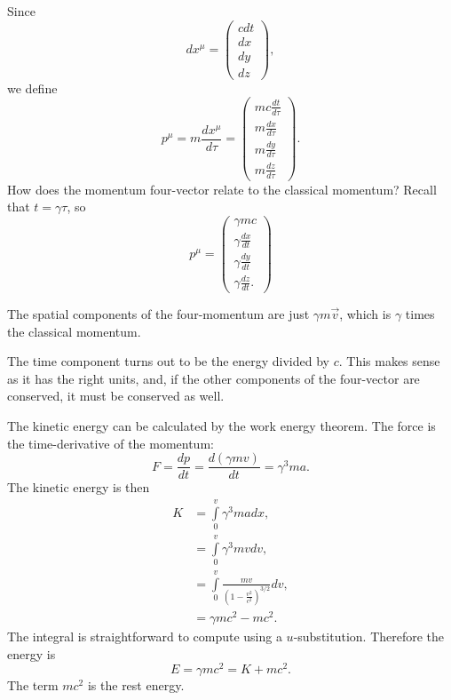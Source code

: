 Since 
\[dx^\mu = \begin{pmatrix}
    cdt \\ dx \\ dy \\ dz
\end{pmatrix}, \] we define 
\[ p^\mu = m \frac{dx^\mu}{d\tau} = \begin{pmatrix}
     mc \frac{dt}{d\tau} \\ m\frac{dx}{d\tau} \\
    m\frac{dy}{d\tau} 
    \\ 
    m\frac{dz}{d\tau}
\end{pmatrix} .\] 
How does the momentum four-vector relate to the classical momentum? Recall that $t = \gamma \tau$, so \[ p^\mu =  \begin{pmatrix}
    \gamma m c \\ \gamma \frac{dx}{dt} \\
    \gamma \frac{dy}{dt} 
    \\ 
    \gamma \frac{dz}{dt}.
\end{pmatrix} \] 

The spatial components of the four-momentum are just $\gamma m \vec{v}$, which is $\gamma$ times the classical momentum. 

The time component turns out to be the energy divided by $c$. This makes sense as it has the right units, and, if the other components of the four-vector are conserved, it must be conserved as well. 

The kinetic energy can be calculated by the work energy theorem. The force is the time-derivative of the momentum: \[F = \frac{dp}{dt} = \frac{d(\gamma m v)}{dt} = \gamma^3 m a. \] The kinetic energy is then 
\begin{align*}
    K &= \int\limits_{0}^{v}  \gamma^3 ma dx, \\
    &= \int\limits_{0}^{v}  \gamma^3 mv dv, \\ &= 
    \int\limits_{0}^{v}   \frac{mv}{\left(1-\frac{v^2}{c^2} \right)^{3/2}} dv, \\
    &= \gamma m c^2 - mc^2.  
\end{align*}
The integral is straightforward to compute using a $u$-substitution. Therefore the energy is \[E = \gamma m c^2 = K + mc^2. \] The term $mc^2$ is the rest energy.